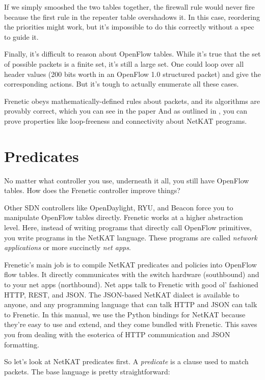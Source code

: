 \bigskip

If we simply smooshed the two tables together, the firewall rule would never fire because the first rule in 
the repeater table overshadows it.  In this case, reordering the priorities might work, but it's impossible to 
do this correctly without a spec to guide it.  

Finally, it's difficult to reason about OpenFlow tables.
While it's true that the set of possible packets is a finite set, it's still a large set.  One could loop
over all header values (200 bits worth in an OpenFlow 1.0 structured packet) 
and give the corresponding actions.  But it's tough to actually enumerate all these cases.

Frenetic obeys mathematically-defined rules about packets, and its algorithms are provably correct, which 
you can see in the paper \citet{DBLP:journals/corr/SmolkaEFG15} 
And as outlined in \citet{Foster:2015:CDP:2775051.2677011}, you can prove properties like loop-freeness and
connectivity about NetKAT programs.  

\section{Predicates}

No matter what controller you use, underneath it all, you still have OpenFlow tables.
How does the Frenetic controller improve things? 

Other SDN controllers like OpenDaylight, RYU, and Beacon force you to manipulate 
OpenFlow tables directly.  
Frenetic works at a higher abstraction level.  
Here, instead of writing programs that directly call OpenFlow primitives, you write programs in 
the NetKAT language.
These programs are called \emph{network applications} or more succinctly \emph{net apps}.

Frenetic's main job is to compile NetKAT predicates and policies into OpenFlow flow tables.  
It directly communicates with the switch hardware (southbound) and to your net apps (northbound).
Net apps talk to Frenetic with good ol' fashioned HTTP, REST, and JSON.
The JSON-based NetKAT dialect is available to anyone, and any programming language that can talk HTTP and 
JSON can talk to Frenetic.
In this manual, we use the Python bindings for NetKAT because they're easy to use and extend, and they
come bundled with Frenetic.  
This saves you from dealing with the esoterica of HTTP communication and JSON formatting.  

So let's look at NetKAT predicates first.  
A \textit{predicate} is a clause used to match packets.
The base language is pretty straightforward:

